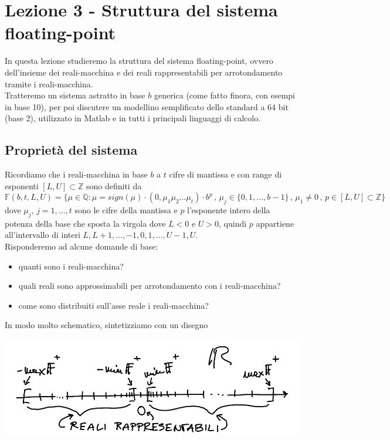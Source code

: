 \documentclass[12pt]{article}
\begin{document}
\section{Lezione 3 - Struttura del sistema floating-point}
In questa lezione studieremo la struttura del sistema floating-point, ovvero dell'insieme dei reali-macchina e dei reali rappresentabili per arrotondamento tramite i reali-macchina.\\
Tratteremo un sistema astratto in base $b$ generica (come fatto finora, con esempi in base 10), per poi discutere un modellino semplificato dello standard a 64 bit (base 2), utilizzato in Matlab e in tutti i principali linguaggi di calcolo.

\subsection{Proprietà del sistema}
Ricordiamo che i reali-macchina in base $b$ a $t$ cifre di mantissa e con range di esponenti $[L,U] \subset \mathbb{Z}$ sono definiti da
\[ \mathbb{F}(b, t, L, U) = \{ \mu \in \mathbb{Q} : \mu = sign(\mu)\cdot (0,\mu_1 \mu_2 \dotsc \mu_t) \cdot b^p \,,\, \mu_j \in \{ 0, 1, \dotsc, b-1 \} \,,\, \mu_1 \ne 0 \,,\, p \in [L,U] \subset \mathbb{Z} \} \]
dove $\mu_j$, $j = 1, \dotsc, t$ sono le cifre della mantissa e $p$ l'esponente intero della potenza della base che sposta la virgola dove $L<0$ e $U>0$, quindi $p$ appartiene all'intervallo di interi $L, L+1, \dotsc, -1, 0, 1, \dotsc, U-1, U$.\\
Risponderemo ad alcune domande di base:
\begin{itemize}
    \item quanti sono i reali-macchina?
    \item quali reali sono approssimabili per arrotondamento con i reali-macchina?
    \item come sono distribuiti sull'asse reale i reali-macchina?
\end{itemize}
In modo molto schematico, sintetizziamo con un disegno 
\begin{center}
    \includegraphics[scale=0.65]{img2.png}
\end{center}
\end{document}
